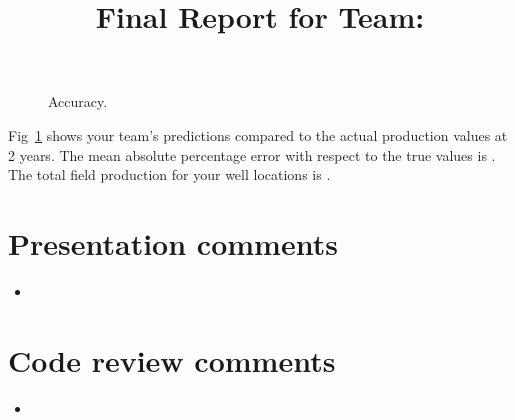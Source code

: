 \documentclass[11pt, oneside]{article}   	%
\title{Final Report for Team: \VAR{teamname}}
\date{}
\begin{document}
\maketitle

\begin{figure}[htbp] %
   \centering
   \scalebox{0.75}{}
   \caption{Accuracy.}
   \label{fig:accuracy}
\end{figure}
%
Fig~\ref{fig:accuracy} shows your team's predictions compared to the actual production values at 2 years.  The mean absolute percentage error with respect to the true values is .  The total field production for your well locations is .


\newpage

\section*{Presentation comments}
\begin{itemize}
  \item {}
\end{itemize}

\section*{Code review comments}
\begin{itemize}
  \item {}
\end{itemize}
\end{document}
